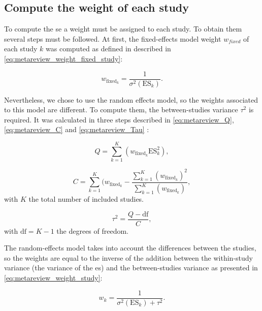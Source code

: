 \documentclass[12pt,a4paper,english]{article}
\begin{document}
\subsection{Compute the weight of each study}

To compute the \gls{se} a weight must be assigned to each study. To obtain them several steps must be followed. At first, the fixed-effects model 
weight $w_{fixed}$ of each study $k$ was computed as defined in \citet{Borenstein2009} described in \cref{eq:metareview_weight_fixed_study}: 

\begin{equation}
\label{eq:metareview_weight_fixed_study}
w_{\text{fixed}_k} = \frac{1}{\sigma^2(\text{ES}_k)}.
\end{equation} 

Nevertheless, we chose to use the random effects model, so the weights associated to this model are different. To compute them, the between-studies 
variance $\tau^2$ is required. It was calculated in three steps described in \cref{eq:metareview_Q}, \cref{eq:metareview_C} and \cref{eq:metareview_Tau} 
\citep{Borenstein2009}:

\begin{equation}
\label{eq:metareview_Q}
Q = \sum_{k=1}^{K} (w_{\text{fixed}_k} \text{ES}_k^2),
\end{equation}

\begin{equation}
\label{eq:metareview_C}
C = \sum_{k=1}^{K} (w_{\text{fixed}_k} - \frac{ \sum_{k=1}^{K} (w_{\text{fixed}_k})^2 } { \sum_{k=1}^{K} (w_{\text{fixed}_k}) },
\end{equation}
with $K$ the total number of included studies.

\begin{equation}
\label{eq:metareview_Tau}
\tau^2 = \frac{Q - \text{df}}{C},
\end{equation}
with $\text{df} = K - 1$ the degrees of freedom.

The random-effects model takes into account the differences between the studies, so the weights are equal to the inverse of the addition between the 
within-study variance (the variance of the \gls{es}) and the between-studies variance as presented in \cref{eq:metareview_weight_study}:

\begin{equation}
\label{eq:metareview_weight_study}
w_k = \frac{1}{\sigma^2(\text{ES}_k) + \tau^2}.
\end{equation} 
\end{document}

